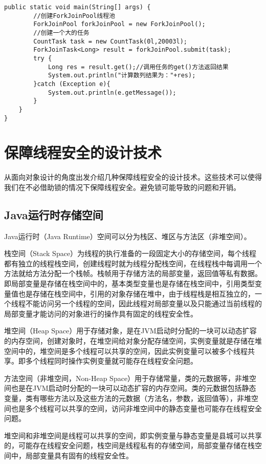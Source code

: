 \documentclass[a4paper]{report}
\begin{document}
\begin{Verbatim}[frame=single,numbersep=5pt,xleftmargin=1.5em,xrightmargin=1.5em]
    public static void main(String[] args) {
        //创建ForkJoinPool线程池
        ForkJoinPool forkJoinPool = new ForkJoinPool();
        //创建一个大的任务
        CountTask task = new CountTask(0l,20003l);
        ForkJoinTask<Long> result = forkJoinPool.submit(task);
        try {
            Long res = result.get();//调用任务的get()方法返回结果
            System.out.println("计算数列结果为："+res);
        }catch (Exception e){
            System.out.println(e.getMessage());
        }
    }
}\end{Verbatim}

\chapter{保障线程安全的设计技术}
从面向对象设计的角度出发介绍几种保障线程安全的设计技术。这些技术可以使得我们在不必借助锁的情况下保障线程安全。避免锁可能导致的问题和开销。

\section{Java运行时存储空间}
Java运行时（Java Runtime）空间可以分为栈区、堆区与方法区（非堆空间）。

栈空间（Stack Space）为线程的执行准备的一段固定大小的存储空间，每个线程都有独立的线程栈空间，创建线程时就为线程分配栈空间，在线程栈中每调用一个方法就给方法分配一个栈帧。栈帧用于存储方法的局部变量，返回值等私有数据。即局部变量是存储在栈空间中的，基本类型变量也是存储在栈空间中，引用类型变量值也是存储在栈空间中，引用的对象存储在堆中，由于线程栈是相互独立的，一个线程不能访问另一个线程的空间，因此线程对局部变量以及只能通过当前线程的局部变量才能访问的对象进行的操作具有固定的线程安全性。

堆空间（Heap Space）用于存储对象，是在JVM启动时分配的一块可以动态扩容的内存空间，创建对象时，在堆空间给对象分配存储空间，实例变量就是存储在堆空间中的，堆空间是多个线程可以共享的空间，因此实例变量可以被多个线程共享。即多个线程同时操作实例变量就可能存在线程安全问题。

方法空间（非堆空间，Non-Heap Space）用于存储常量，类的元数据等，非堆空间也是在JVM启动时分配的一块可以动态扩容的内存空间。类的元数据包括静态变量，类有哪些方法以及这些方法的元数据（方法名，参数，返回值等），非堆空间也是多个线程可以共享的空间，访问非堆空间中的静态变量也可能存在线程安全问题。

堆空间和非堆空间是线程可以共享的空间，即实例变量与静态变量是县城可以共享的，可能存在线程安全问题，栈空间是线程私有的存储空间，局部变量存储在栈空间中，局部变量具有固有的线程安全性。
\end{document}
